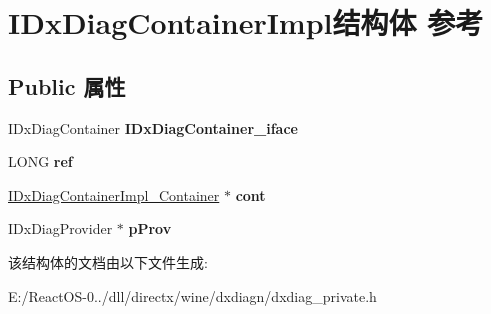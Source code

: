 \hypertarget{struct_i_dx_diag_container_impl}{}\section{I\+Dx\+Diag\+Container\+Impl结构体 参考}
\label{struct_i_dx_diag_container_impl}
\subsection*{Public 属性}
\begin{DoxyCompactItemize}
\item 
\mbox{\label{struct_i_dx_diag_container_impl_a8ffd58cef08a2b76c087e6eb7290b712}} 
I\+Dx\+Diag\+Container {\bfseries I\+Dx\+Diag\+Container\+\_\+iface}
\item 
\mbox{\label{struct_i_dx_diag_container_impl_ac319d581d2941faa04f77225a9c597fc}} 
L\+O\+NG {\bfseries ref}
\item 
\mbox{\label{struct_i_dx_diag_container_impl_a4d5b01aedfe2dd4d75bad0cecba4a185}} 
\hyperlink{struct_i_dx_diag_container_impl___container}{I\+Dx\+Diag\+Container\+Impl\+\_\+\+Container} $\ast$ {\bfseries cont}
\item 
\mbox{\label{struct_i_dx_diag_container_impl_a3fdcf420273de880f7b0d87ad456c968}} 
I\+Dx\+Diag\+Provider $\ast$ {\bfseries p\+Prov}
\end{DoxyCompactItemize}


该结构体的文档由以下文件生成\+:\begin{DoxyCompactItemize}
\item 
E\+:/\+React\+O\+S-\/0../dll/directx/wine/dxdiagn/dxdiag\+\_\+private.\+h\end{DoxyCompactItemize}
